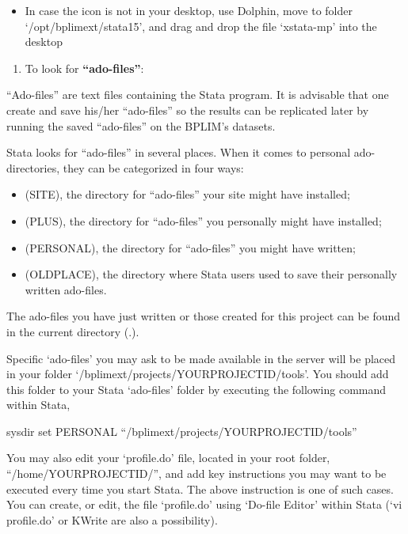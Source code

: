 \documentclass[]{book}
\providecommand{\tightlist}{%
  \setlength{\itemsep}{0pt}\setlength{\parskip}{0pt}}
\begin{document}
\begin{itemize}
\tightlist
\item
  In case the icon is not in your desktop, use Dolphin, move to folder
  `/opt/bplimext/stata15', and drag and drop the file `xstata-mp' into
  the desktop
\end{itemize}

\begin{enumerate}
\def\labelenumi{\arabic{enumi}.}
\setcounter{enumi}{1}
\tightlist
\item
  To look for \textbf{``ado-files''}:
\end{enumerate}

``Ado-files'' are text files containing the Stata program. It is
advisable that one create and save his/her ``ado-files'' so the results
can be replicated later by running the saved ``ado-files'' on the
BPLIM's datasets.

Stata looks for ``ado-files'' in several places. When it comes to
personal ado-directories, they can be categorized in four ways:

\begin{itemize}
\item
  (SITE), the directory for ``ado-files'' your site might have
  installed;
\item
  (PLUS), the directory for ``ado-files'' you personally might have
  installed;
\item
  (PERSONAL), the directory for ``ado-files'' you might have written;
\item
  (OLDPLACE), the directory where Stata users used to save their
  personally written ado-files.
\end{itemize}

The ado-files you have just written or those created for this project
can be found in the current directory (.).

Specific `ado-files' you may ask to be made available in the server
will be placed in your folder
`/bplimext/projects/YOURPROJECTID/tools'. You should add this folder
to your Stata `ado-files' folder by executing the following command
within Stata,

sysdir set PERSONAL ``/bplimext/projects/YOURPROJECTID/tools''

You may also edit your `profile.do' file, located in your root folder,
``/home/YOURPROJECTID/'', and add key instructions you may want to be
executed every time you start Stata. The above instruction is one of
such cases. You can create, or edit, the file `profile.do' using
`Do-file Editor' within Stata (`vi profile.do' or KWrite are also a
possibility).
\end{document}

